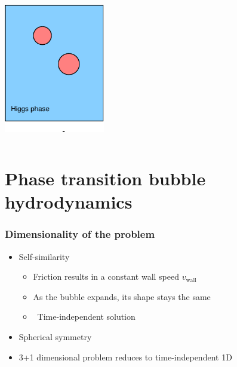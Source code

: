 \begin{frame}
\begin{columns}
\begin{column}{0.4\textwidth}
        \includegraphics[width=0.33\textwidth]{../fig/HiggsBubble3}
    \end{column}
    \end{columns}
\end{frame}

\section{Phase transition bubble hydrodynamics}

\begin{frame}
    \frametitle{Dimensionality of the problem}
    \begin{itemize}
        \item Self-similarity
        \begin{itemize}
            \item Friction results in a constant wall speed $v_\text{wall}$
            \item As the bubble expands, its shape stays the same
            \item \textrightarrow \ Time-independent solution
        \end{itemize}
        \item Spherical symmetry
        \item 3+1 dimensional problem reduces to time-independent 1D
    \end{itemize}
\end{frame}

